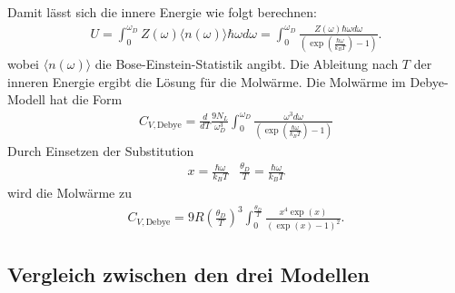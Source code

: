Damit lässt sich die innere Energie wie folgt berechnen:
\begin{align*}
    U =  \int_0^{\omega_D} Z(\omega) \langle n(\omega)\rangle \hbar \omega d \omega=  \int_0^{\omega_D} \frac{Z(\omega) \hbar \omega d \omega}{\left(\exp \left(\frac{\hbar \omega}{k_B T}\right) -1 \right)}.
\end{align*}
wobei $\langle n(\omega)\rangle$ die Bose-Einstein-Statistik angibt. Die Ableitung nach $T$ der inneren Energie ergibt die Lösung für die Molwärme. Die Molwärme im Debye-Modell hat die Form
\begin{align*}
    C_{V,\text{Debye}}= \frac{d}{d T}\frac{9 N_L}{\omega_D^3} \int_0^{\omega_D} \frac{\omega^3 d\omega}{\left(\exp \left(\frac{\hbar \omega}{k_B T}\right) -1 \right)}
\end{align*}
Durch Einsetzen der Substitution 
\begin{align*}
    x = \frac{\hbar \omega}{k_B T} &  \frac{\theta_D}{T} = \frac{\hbar \omega}{ k_B T}
\end{align*}
wird die Molwärme zu
\begin{align*}
    C_{V,\text{Debye}} = 9 R \left(\frac{\theta_D}{T}\right)^3 \int_0^{\frac{\theta_D}{T}} \frac{x^4 \exp \left(x\right)}{ \left(\exp(x) -1\right)^2}.
\end{align*}
\subsection{Vergleich zwischen den drei Modellen}